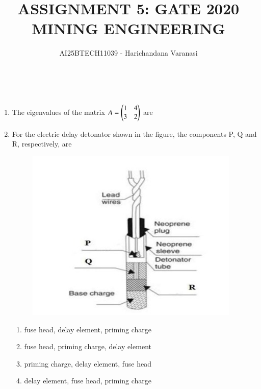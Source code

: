 \documentclass[journal,12pt,onecolumn]{IEEEtran}
\theoremstyle{remark}
\begin{document}
\title{
ASSIGNMENT 5: GATE 2020 MINING ENGINEERING  }\\

\author{AI25BTECH11039 - Harichandana Varanasi }
\maketitle
\renewcommand{\thefigure}{\theenumi}
\renewcommand{\thetable}{\theenumi}

\begin{enumerate}

\item The eigenvalues of the matrix $A=\myvec{1 & 4 \\ 3 & 2}$ are

\hfill{}

\begin{enumerate}
\end{enumerate}

\item For the electric delay detonator shown in the figure, the components P, Q and R, respectively, are

\hfill{}

\begin{figure}[H]
\centering
\includegraphics[width=0.3\columnwidth]{figs/2018MN2.jpeg}
\caption*{}
\label{fig:q2}
\end{figure}

\begin{enumerate}
\item fuse head, delay element, priming charge
\item fuse head, priming charge, delay element
\item priming charge, delay element, fuse head
\item delay element, fuse head, priming charge
\end{enumerate}


\end{enumerate}
\end{document}
